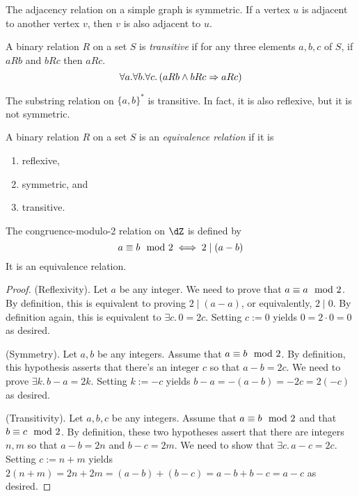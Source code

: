 \documentclass{amsart}
\begin{document}
\begin{eg}
  The adjacency relation on a simple graph is symmetric.
  If a vertex $u$ is adjacent to another vertex $v$, then $v$ is also adjacent to $u$.
\end{eg}

\begin{defn}[Transitivity]
  A binary relation $R$ on a set $S$ is \emph{transitive} if for any three elements $a,b,c$ of $S$, if $aRb$ and $bRc$ then $aRc$.
  \[
    \forall a.\forall b.\forall c.\,(aRb \wedge bRc \Rightarrow aRc)
  \]
\end{defn}

\begin{eg}
  The substring relation on $\{a,b\}^{*}$ is transitive.
  In fact, it is also reflexive, but it is not symmetric.
\end{eg}

\begin{defn}
  A binary relation $R$ on a set $S$ is an \emph{equivalence relation} if it is
  \begin{enumerate}
  \item reflexive,
  \item symmetric, and
  \item transitive.
  \end{enumerate}
\end{defn}

\begin{prop}\label{prop:cng-mod-equiv}
  The congruence-modulo-2 relation on $\dZ$ is defined by
  \[
    a \equiv b \mod{2} \iff 2 \mid (a - b)
  \]
  It is an equivalence relation.
\end{prop}
\begin{proof}
  (Reflexivity). Let $a$ be any integer.
  We need to prove that $a \equiv a \mod{2}$.
  By definition, this is equivalent to proving $2 \mid (a - a)$, or equivalently, $2 \mid 0$.
  By definition again, this is equivalent to $\exists c.\,0 = 2c$.
  Setting $c := 0$ yields $0 = 2 \cdot 0 = 0$ as desired.

  (Symmetry). Let $a, b$ be any integers.
  Assume that $a \equiv b \mod{2}$.
  By definition, this hypothesis asserts that there's an integer $c$ so that $a - b = 2c$.
  We need to prove $\exists k.\,b - a = 2k$.
  Setting $k := -c$ yields $b - a = -(a - b) = -2c = 2(-c)$ as desired.

  (Transitivity). Let $a, b, c$ be any integers.
  Assume that $a \equiv b \mod{2}$ and that $b \equiv c \mod{2}$.
  By definition, these two hypotheses assert that there are integers $n, m$ so that $a - b = 2n$ and $b - c = 2m$.
  We need to show that $\exists c.\,a - c = 2c$.
  Setting $c := n + m$ yields $2(n + m) = 2n + 2m = (a - b) + (b - c) = a - b + b - c = a - c$ as desired.
\end{proof}
\end{document}
